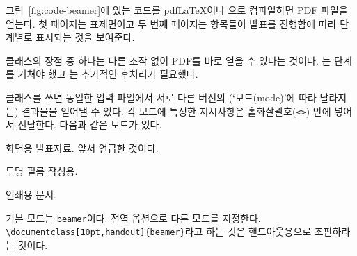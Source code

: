 그림~\ref{fig:code-beamer}에 있는 코드를 pdf\LaTeX 이나 \XeLaTeX 으로 컴파일하면 PDF 파일을 얻는다. 첫 페이지는 표제면이고 두 번째 페이지는 
항목들이 발표를 진행함에 따라 단계별로 표시되는 것을 보여준다.

 클래스의 장점 중 하나는 다른 조작 없이 PDF를 바로 얻을 수 있다는 것이다. 는 \PSi{} 단계를 거쳐야 했고 는 추가적인 후처리가 필요했다.

 클래스를 쓰면 동일한 입력 파일에서 서로 다른 버전의 (`모드(mode)'에 따라 달라지는) 결과물을 얻어낼 수 있다. 각 모드에 특정한 지시사항은 홑화살괄호(\verb|<>|) 안에 넣어서 전달한다. 다음과 같은 모드가 있다.
\begin{description} \firmlist
\item[beamer] 화면용 발표자료. 앞서 언급한 것이다.
\item[trans] 투명 필름 작성용.
\item[handout] 인쇄용 문서.
\end{description}
기본 모드는 \texttt{beamer}이다. 전역 옵션으로 다른 모드를 지정한다. \\
\verb|\documentclass[10pt,handout]{beamer}|\allowbreak 라고 하는 것은 핸드아웃용으로 조판하라는 것이다.

